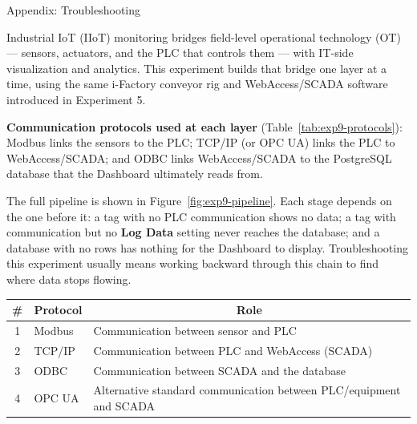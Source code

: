 \begin{labsection}{Appendix: Troubleshooting}{}
  \begin{introduction}
    Industrial IoT (IIoT) monitoring bridges field-level operational technology (OT) --- sensors, actuators, and the PLC that controls them --- with IT-side visualization and analytics. This experiment builds that bridge one layer at a time, using the same i-Factory conveyor rig and WebAccess/SCADA software introduced in Experiment 5.
    \vspace*{1.5em}

    \textbf{Communication protocols used at each layer} (Table~\ref{tab:exp9-protocols}): Modbus links the sensors to the PLC; TCP/IP (or OPC UA) links the PLC to WebAccess/SCADA; and ODBC links WebAccess/SCADA to the PostgreSQL database that the Dashboard ultimately reads from.
    \vspace*{1.5em}

    The full pipeline is shown in Figure~\ref{fig:exp9-pipeline}. Each stage depends on the one before it: a tag with no PLC communication shows no data; a tag with communication but no \textbf{Log Data} setting never reaches the database; and a database with no rows has nothing for the Dashboard to display. Troubleshooting this experiment usually means working backward through this chain to find where data stops flowing.
  \end{introduction}

  \begin{boxedtable}
    \label{tab:exp9-protocols}
    \centering
    \begin{tabular}{cll}
      \toprule
      \# & Protocol & \multicolumn{1}{c}{Role}                                           \\
      \midrule
      1  & Modbus   & Communication between sensor and PLC                               \\[1.5em]
      2  & TCP/IP   & Communication between PLC and WebAccess (SCADA)                    \\[1.5em]
      3  & ODBC     & Communication between SCADA and the database                       \\[1.5em]
      4  & OPC UA   & Alternative standard communication between PLC/equipment and SCADA \\
      \bottomrule
    \end{tabular}
  \end{boxedtable}
  \vspace*{10mm}

  \begin{boxedfigure}
    \centering
\end{boxedfigure}
\end{labsection}
